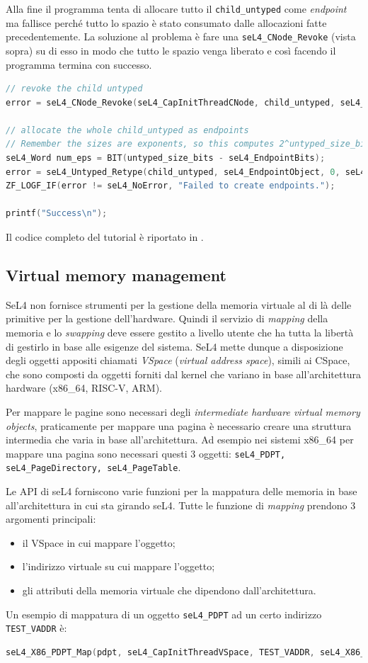 Alla fine il programma tenta di allocare tutto il \texttt{child\_untyped} come \textit{endpoint} ma fallisce perché tutto lo spazio è stato consumato dalle allocazioni fatte precedentemente. La soluzione al problema è fare una \texttt{seL4\_CNode\_Revoke} (vista sopra) su di esso in modo che tutto le spazio venga liberato e così facendo il programma termina con successo. 
\begin{lstlisting}[language=C++]
// revoke the child untyped
error = seL4_CNode_Revoke(seL4_CapInitThreadCNode, child_untyped, seL4_WordBits);

// allocate the whole child_untyped as endpoints
// Remember the sizes are exponents, so this computes 2^untyped_size_bits / 2^seL4_EndpointBits:
seL4_Word num_eps = BIT(untyped_size_bits - seL4_EndpointBits);
error = seL4_Untyped_Retype(child_untyped, seL4_EndpointObject, 0, seL4_CapInitThreadCNode, 0, 0, child_tcb, num_eps);
ZF_LOGF_IF(error != seL4_NoError, "Failed to create endpoints.");

printf("Success\n");
\end{lstlisting}
Il codice completo del tutorial è riportato in \cite{untyped}.

\subsection{Virtual memory management}
SeL4 non fornisce strumenti per la gestione della memoria virtuale al di là delle primitive per la gestione dell'hardware. Quindi il servizio di \textit{mapping} della memoria e lo \textit{swapping} deve essere gestito a livello utente che ha tutta la libertà di gestirlo in base alle esigenze del sistema. SeL4 mette dunque a disposizione degli oggetti appositi chiamati \textit{VSpace} (\textit{virtual address space}), simili ai CSpace, che sono composti da oggetti forniti dal kernel che variano in base all'architettura hardware (x86\_64, RISC-V, ARM).

Per mappare le pagine sono necessari degli \textit{intermediate hardware virtual memory objects}, praticamente per mappare una pagina è necessario creare una struttura intermedia che varia in base all'architettura. Ad esempio nei sistemi x86\_64 per mappare una pagina sono necessari questi 3 oggetti: \texttt{seL4\_PDPT, seL4\_PageDirectory, seL4\_PageTable}. 

Le API di seL4 forniscono varie funzioni per la mappatura delle memoria in base all'architettura in cui sta girando seL4. Tutte le funzione di \textit{mapping} prendono 3 argomenti principali:
\begin{itemize}
	\item il VSpace in cui mappare l'oggetto;
	\item l'indirizzo virtuale su cui mappare l'oggetto;
	\item gli attributi della memoria virtuale che dipendono dall'architettura.
\end{itemize}
Un esempio di mappatura di un oggetto \texttt{seL4\_PDPT} ad un certo indirizzo \texttt{TEST\_VADDR} è:
\begin{lstlisting}[language=C++]
seL4_X86_PDPT_Map(pdpt, seL4_CapInitThreadVSpace, TEST_VADDR, seL4_X86_Default_VMAttributes);
\end{lstlisting}

